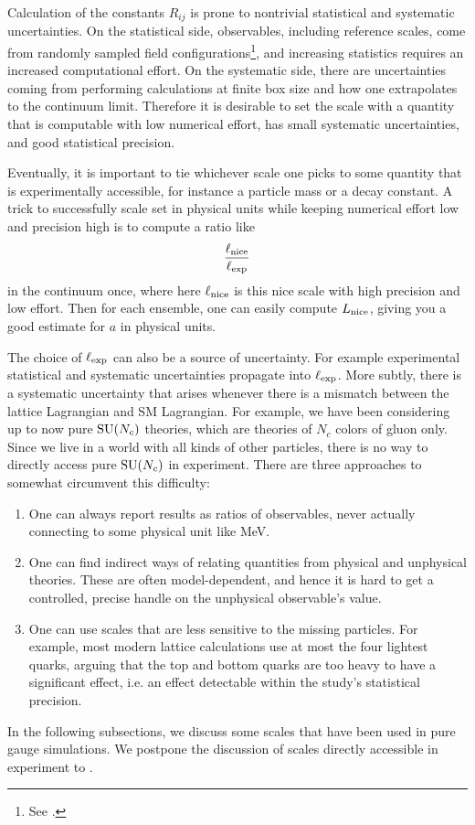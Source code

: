 Calculation of the constants $R_{ij}$ is prone to nontrivial statistical and
systematic uncertainties. On the statistical side, observables, including
reference scales, come from randomly sampled field 
configurations\footnote{See .}, and increasing statistics
requires an increased computational effort. On the systematic side, there are
uncertainties coming from performing calculations at finite box size and how one
extrapolates to the continuum limit. Therefore it is desirable to set
the scale with a quantity that is computable with low numerical effort,
has small systematic uncertainties, and good statistical precision.


Eventually, it is important to tie whichever scale one picks to some
quantity that is experimentally accessible, for instance a particle
mass or a decay constant. A trick to successfully scale set in physical
units while keeping numerical effort low and precision high is to
compute a ratio like
\begin{equation}
\frac{\ell_{\rm nice}}{\ell_{\rm exp}}
\end{equation}
in the continuum once, where here $\ell_{\rm nice}$ is this nice scale with
high precision and low effort. Then for each ensemble, one can
easily compute $L_{\rm nice}$, giving you a good estimate for $a$ in physical units.


The choice of $\ell_{\rm exp}$ can also be a source of uncertainty. For example
experimental statistical and systematic uncertainties propagate into 
$\ell_{\rm exp}$. More subtly, there is a systematic uncertainty that arises
whenever there is a mismatch between the lattice Lagrangian and SM Lagrangian.
For example, we have been considering up to now pure $\operatorname{SU}(N_c)$ theories, which
are theories of $N_c$ colors of gluon only. Since we live in a world with all
kinds of other particles, there is no way to directly access pure $\operatorname{SU}(N_c)$ in
experiment. There are three approaches to somewhat circumvent this difficulty:
\begin{enumerate}
\item One can always report results as ratios of observables, never actually
connecting to some physical unit like MeV.
\item One can find indirect ways of relating quantities from physical and
unphysical theories. These are often model-dependent, and hence it is hard to
get a controlled, precise handle on the unphysical observable's value.
\item One can use scales that are less sensitive to the missing particles. For
example, most modern lattice calculations use at most the four lightest quarks,
arguing that the top and bottom quarks are too heavy to have a significant
effect, i.e. an effect detectable within the study's statistical precision.
\end{enumerate}
In the following subsections, we discuss some scales that have been used in pure
gauge simulations. We postpone the discussion of scales directly accessible in
experiment to .


